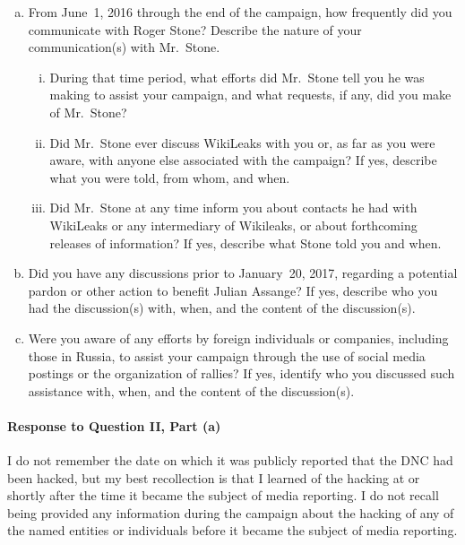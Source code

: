 \begin{enumerate}[a.]
\item From June~1, 2016 through the end of the campaign, how frequently did you communicate with Roger Stone? Describe the nature of your communication(s) with Mr.~Stone.

\begin{enumerate}[i.]

\item During that time period, what efforts did Mr.~Stone tell you he was making to assist your campaign, and what requests, if any, did you make of Mr.~Stone?

\item Did Mr.~Stone ever discuss WikiLeaks with you or, as far as you were aware, with anyone else associated with the campaign?
If yes, describe what you were told, from whom, and when.

\item Did Mr.~Stone at any time inform you about contacts he had with WikiLeaks or any intermediary of Wikileaks, or about forthcoming releases of information?
If yes, describe what Stone told you and when.

\end{enumerate}

\item Did you have any discussions prior to January~20, 2017, regarding a potential pardon or other action to benefit Julian Assange?
If yes, describe who you had the discussion(s) with, when, and the content of the discussion(s).

\item Were you aware of any efforts by foreign individuals or companies, including those in Russia, to assist your campaign through the use of social media postings or the organization of rallies?
If yes, identify who you discussed such assistance with, when, and the content of the discussion(s).

\end{enumerate}

\paragraph*{Response to Question II, Part (a)}

I do not remember the date on which it was publicly reported that the DNC had been hacked, but my best recollection is that I learned of the hacking at or shortly after the time it became the subject of media reporting.
I do not recall being provided any information during the campaign about the hacking of any of the named entities or individuals before it became the subject of media reporting.

